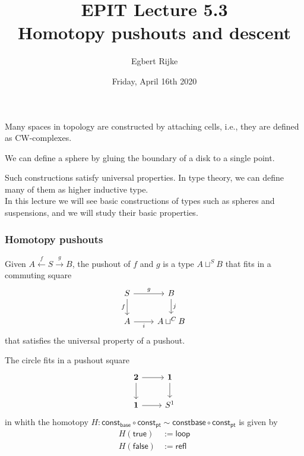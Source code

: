 \documentclass[handout]{beamer}
\title{EPIT Lecture 5.3\\ Homotopy pushouts and descent}
\author{Egbert Rijke}
\date{Friday, April 16th 2020}
\newcommand{\sphere}[1]{S^{#1}}
\newcommand{\htpy}{\sim}
\newcommand{\refl}{\mathsf{refl}}
\newcommand{\baseS}{\mathsf{base}}
\newcommand{\loopS}{\mathsf{loop}}
\newcommand{\const}{\mathsf{const}}
\newcommand{\btrue}{\mathsf{true}}
\newcommand{\bfalse}{\mathsf{false}}
\newcommand{\ttt}{\mathsf{pt}}
\begin{document}
\begin{frame}
  \maketitle
\end{frame}

\begin{frame}
  Many spaces in topology are constructed by attaching cells, i.e., they are defined as CW-complexes.
  \begin{example}
    We can define a sphere by gluing the boundary of a disk to a single point.
  \end{example}
  Such constructions satisfy universal properties. In type theory, we can define many of them as higher inductive type.\\[1em]

  In this lecture we will see basic constructions of types such as spheres and suspensions, and we will study their basic properties.
\end{frame}

\begin{frame}
  \frametitle{Homotopy pushouts}
  Given $A \stackrel{f}{\leftarrow} S \stackrel{g}{\rightarrow} B$, the pushout of $f$ and $g$ is a type $A\sqcup^S B$ that fits in a commuting square
  \begin{equation*}
    \begin{tikzcd}[ampersand replacement=\&]
      S \arrow[d,swap,"f"] \arrow[r,"g"] \& B \arrow[d,"j"] \\
      A \arrow[r,swap,"i"] \& A\sqcup^C B
    \end{tikzcd}
  \end{equation*}
  that satisfies the universal property of a pushout.
\end{frame}

\begin{frame}
  \begin{example}
    The circle fits in a pushout square
    \begin{equation*}
      \begin{tikzcd}[ampersand replacement=\&]
        \mathbf{2} \arrow[r] \arrow[d] \& \mathbf{1} \arrow[d] \\
        \mathbf{1} \arrow[r] \& \sphere{1}
      \end{tikzcd}
    \end{equation*}
    in whith the homotopy $H:\const_\baseS\circ\const_\ttt\htpy\const\baseS\circ\const_\ttt$ is given by
    \begin{align*}
      H(\btrue) & := \loopS \\
      H(\bfalse) & := \refl
    \end{align*}    
  \end{example}
\end{frame}
\end{document}
